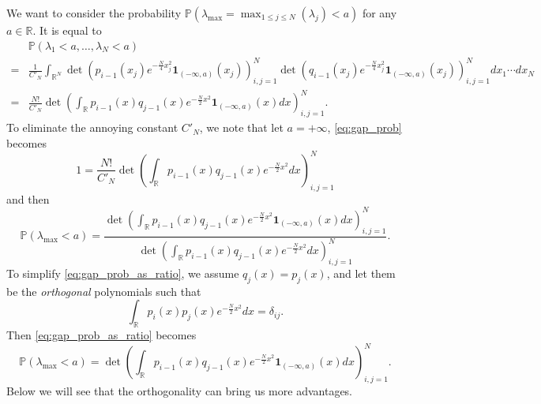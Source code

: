 \documentclass[11pt, a4paper]{article}
\numberwithin{equation}{section}
\newcommand{\id}{\mathbf{1}}
\newcommand{\realR}{\mathbb{R}}
\newcommand{\Prob}{\mathbb{P}}
\theoremstyle{definition}
\theoremstyle{remark}
\begin{document}
We want to consider the probability $\Prob(\lambda_{\max} = \max_{1 \leq j \leq N}(\lambda_j) < a)$ for any $a \in \realR$. It is equal to
\begin{equation} \label{eq:gap_prob}
  \begin{split}
    & \Prob(\lambda_1 < a, \dotsc, \lambda_N < a) \\
    = {}& \frac{1}{C'_N} \int_{\realR^N} \det(p_{i - 1}(x_j) e^{-\frac{N}{4}x^2_j} \id_{(-\infty, a)}(x_j))^N_{i, j = 1} \det(q_{i - 1}(x_j) e^{-\frac{N}{4}x^2_j} \id_{(-\infty, a)}(x_j))^N_{i, j = 1} dx_1 \dotsm dx_N \\
    = {}& \frac{N!}{C'_N} \det \left( \int_{\realR} p_{i - 1}(x) q_{j - 1}(x) e^{-\frac{N}{2}x^2} \id_{(-\infty, a)}(x) dx \right)^N_{i, j = 1}.
  \end{split}
\end{equation}
To eliminate the annoying constant $C'_N$, we note that let $a = +\infty$, \eqref{eq:gap_prob} becomes
\begin{equation}
  1 = \frac{N!}{C'_N} \det \left( \int_{\realR} p_{i - 1}(x) q_{j - 1}(x) e^{-\frac{N}{2}x^2} dx \right)^N_{i, j = 1}
\end{equation}
and then
\begin{equation} \label{eq:gap_prob_as_ratio}
  \Prob(\lambda_{\max} < a) = \frac{\det \left( \int_{\realR} p_{i - 1}(x) q_{j - 1}(x) e^{-\frac{N}{2}x^2} \id_{(-\infty, a)}(x) dx \right)^N_{i, j = 1}}{\det \left( \int_{\realR} p_{i - 1}(x) q_{j - 1}(x) e^{-\frac{N}{2}x^2} dx \right)^N_{i, j = 1}}.
\end{equation}
To simplify \eqref{eq:gap_prob_as_ratio}, we assume $q_j(x) = p_j(x)$, and let them be the \emph{orthogonal} polynomials such that
\begin{equation} \label{eq:orthogonality_for_p}
  \int_{\realR} p_i(x) p_j(x) e^{-\frac{N}{2}x^2} dx = \delta_{ij}.
\end{equation}
Then \eqref{eq:gap_prob_as_ratio} becomes
\begin{equation}
  \Prob(\lambda_{\max} < a) = \det \left( \int_{\realR} p_{i - 1}(x) q_{j - 1}(x) e^{-\frac{N}{2}x^2} \id_{(-\infty, a)}(x) dx \right)^N_{i, j = 1}.
\end{equation}
Below we will see that the orthogonality can bring us more advantages.
\end{document}
